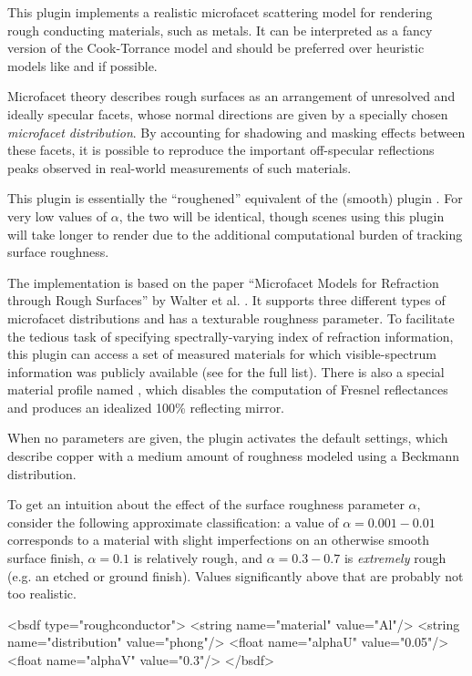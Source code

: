 \vspace{3mm}
This plugin implements a realistic microfacet scattering model for rendering
rough conducting materials, such as metals. It can be interpreted as a fancy
version of the Cook-Torrance model and should be preferred over
heuristic models like  and  if possible.

Microfacet theory describes rough surfaces as an arrangement of unresolved
and ideally specular facets, whose normal directions are given by a
specially chosen \emph{microfacet distribution}. By accounting for shadowing
and masking effects between these facets, it is possible to reproduce the
important off-specular reflections peaks observed in real-world measurements
of such materials.

This plugin is essentially the ``roughened'' equivalent of the (smooth) plugin
. For very low values of $\alpha$, the two will
be identical, though scenes using this plugin will take longer to render
due to the additional computational burden of tracking surface roughness.

The implementation is based on the paper ``Microfacet Models
for Refraction through Rough Surfaces'' by Walter et al.
\cite{Walter07Microfacet}. It supports three different types of microfacet
distributions and has a texturable roughness parameter.
To facilitate the tedious task of specifying spectrally-varying index of
refraction information, this plugin can access a set of measured materials
for which visible-spectrum information was publicly available
(see  for the full list).
There is also a special material profile named , which disables
the computation of Fresnel reflectances and produces an idealized
100\% reflecting mirror.

When no parameters are given, the plugin activates the default settings,
which describe copper with a medium amount of roughness modeled using a
Beckmann distribution.

To get an intuition about the effect of the surface roughness parameter
$\alpha$, consider the following approximate classification: a value of
$\alpha=0.001-0.01$ corresponds to a material with slight imperfections
on an otherwise smooth surface finish, $\alpha=0.1$ is relatively rough,
and $\alpha=0.3-0.7$ is \emph{extremely} rough (e.g. an etched or ground
finish). Values significantly above that are probably not too realistic.
\vspace{4mm}
\begin{xml}[caption={A material definition for brushed aluminium}, label=lst:roughconductor-aluminium]
<bsdf type="roughconductor">
    <string name="material" value="Al"/>
    <string name="distribution" value="phong"/>
    <float name="alphaU" value="0.05"/>
    <float name="alphaV" value="0.3"/>
</bsdf>
\end{xml}

